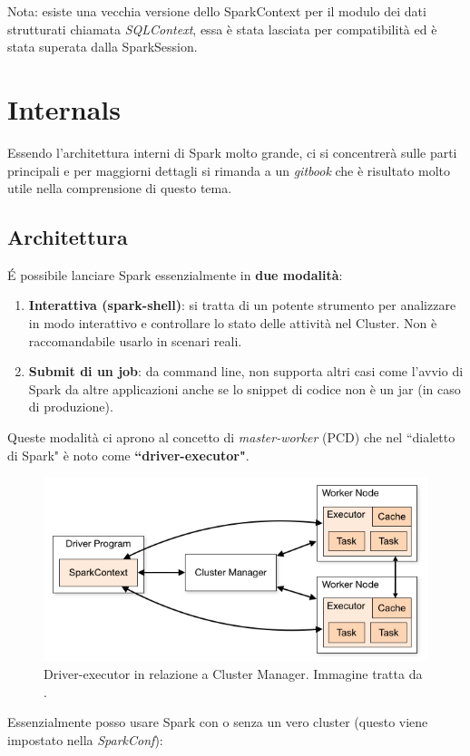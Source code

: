 \documentclass[12pt,italian]{article}
\begin{document}
Nota: esiste una vecchia versione dello SparkContext per il modulo dei dati strutturati chiamata \textit{SQLContext}, essa è stata lasciata per compatibilità ed è stata superata dalla SparkSession.
\section{Internals}
Essendo l'architettura interni di Spark molto grande, ci si concentrerà sulle parti principali e per maggiorni dettagli si rimanda a un \textit{gitbook} \cite{internals} che è risultato molto utile nella comprensione di questo tema.
\subsection{Architettura}
É possibile lanciare Spark essenzialmente in \textbf{due modalità}:
\begin{enumerate}
	\item \textbf{Interattiva (spark-shell)}: si tratta di un potente strumento per analizzare in modo interattivo e controllare lo stato delle attività nel Cluster. Non è raccomandabile usarlo in scenari reali.
	\item \textbf{Submit di un job}: da command line, non supporta altri casi come l'avvio di Spark da altre applicazioni anche se lo snippet di codice non è un jar (in caso di produzione).
\end{enumerate}
Queste modalità ci aprono al concetto di \textit{master-worker} (PCD) che nel ``dialetto di Spark" è noto come \textbf{``driver-executor"}.
\begin{figure}[H]
	\centering 
	\includegraphics[width=1\linewidth]{img/cluster-overview.png}
	\caption{Driver-executor in relazione a Cluster Manager. Immagine tratta da \cite{spark}.}
	\label{fig:driverexecutor}
\end{figure}
Essenzialmente posso usare Spark con o senza un vero cluster (questo viene impostato nella \textit{SparkConf}):
\end{document}
